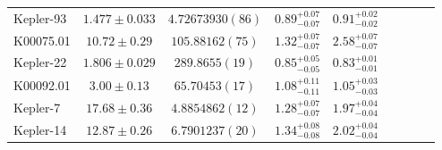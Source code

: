 \documentclass[a4paper,fleqn,usenatbib]{mnras}
\begin{document}
\begin{table*}
\begin{tabular}{lcccccccc}
Kepler-93&	$1.477 \pm 0.033$	&$ 4.72673930 (86)$    	&$0.89^{+0.07}_{-0.07}$	&$0.91^{+0.02}_{-0.02}$	\\
K00075.01&	$10.72 \pm 0.29$   &$105.88162 (75)$     	&$1.32^{+0.07}_{-0.07}$	&$2.58^{+0.07}_{-0.07}$	\\
Kepler-22&	$1.806 \pm 0.029$  &$289.8655 (19)$      	&$0.85^{+0.05}_{-0.05}$	&$0.83^{+0.01}_{-0.01}$	\\
K00092.01&	$3.00 \pm 0.13$	    &$65.70453 (17)$      	&$1.08^{+0.11}_{-0.11}$	&$1.05^{+0.03}_{-0.03}$	\\
Kepler-7&	$17.68 \pm 0.36$	&$ 4.8854862 (12)$   	&$1.28^{+0.07}_{-0.07}$	&$1.97^{+0.04}_{-0.04}$	\\
Kepler-14&	$12.87 \pm 0.26$	&$ 6.7901237 (20)$  	&$1.34^{+0.08}_{-0.08}$	&$2.02^{+0.04}_{-0.04}$	\\
\end{tabular}
\end{table*}
\end{document}
